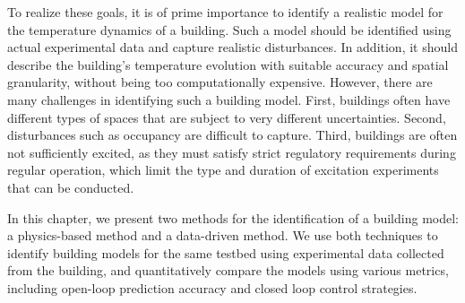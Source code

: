 \documentclass[../../thesis.tex]{subfiles}
\begin{document}
To realize these goals, it is of prime importance to identify a realistic model for the temperature dynamics of a building.
Such a model should be identified using actual experimental data and capture realistic disturbances. 
In addition, it should describe the building's temperature evolution with suitable accuracy and spatial granularity, without being too computationally expensive.
However, there are many challenges in identifying such a building model. 
First, buildings often have different types of spaces that are subject to very different uncertainties. 
Second, disturbances such as occupancy are difficult to capture. 
Third, buildings are often not sufficiently excited, as they must satisfy strict regulatory requirements during regular operation, which limit the type and duration of excitation experiments that can be conducted.  

In this chapter, we present two methods for the identification of a building model: a physics-based method and a data-driven method. 
We use both techniques to identify building models for the same testbed using experimental data collected from the building, and quantitatively compare the models using various metrics, including open-loop prediction accuracy and closed loop control strategies. 








\end{document}
